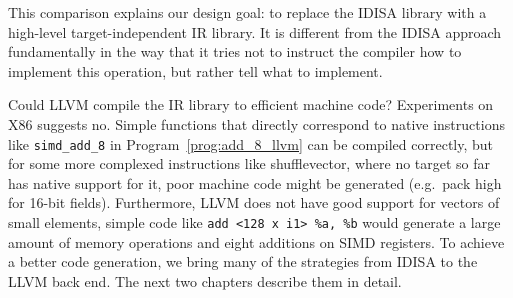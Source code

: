This comparison explains our design goal: to replace the IDISA library with a high-level target-independent IR library. It is different from the IDISA approach fundamentally in the way that it tries not to instruct the compiler how to implement this operation, but rather tell what to implement.

Could LLVM compile the IR library to efficient machine code? Experiments on X86 suggests no. Simple functions that directly correspond to native instructions like {\tt simd\_add\_8} in Program~\ref{prog:add_8_llvm} can be compiled correctly, but for some more complexed instructions like shufflevector, where no target so far has native support for it, poor machine code might be generated (e.g.\ pack high for 16-bit fields). Furthermore, LLVM does not have good support for vectors of small elements, simple code like \verb|add <128 x i1> %a, %b| would generate a large amount of memory operations and eight additions on SIMD registers. To achieve a better code generation, we bring many of the strategies from IDISA to the LLVM back end. The next two chapters describe them in detail.

